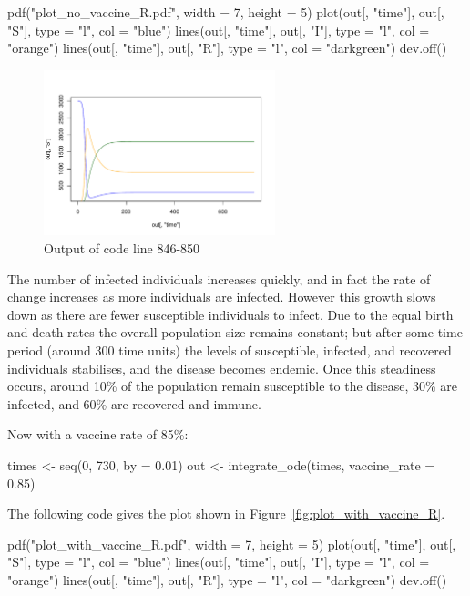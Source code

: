 \begin{Rin-no-test}
pdf("plot_no_vaccine_R.pdf", width = 7, height = 5)
plot(out[, "time"], out[, "S"], type = "l", col = "blue")
lines(out[, "time"], out[, "I"], type = "l", col = "orange")
lines(out[, "time"], out[, "R"], type = "l", col = "darkgreen")
dev.off()
\end{Rin-no-test}


\begin{figure}
\begin{center}
\includegraphics[width=0.6\textwidth]{./assets/plot_no_vaccine_R.pdf}
\end{center}
\caption{Output of code line 846-850}
\label{fig:plot_no_vaccine_R}
\end{figure}

The number of infected individuals increases quickly, and in fact the rate of
change increases as more individuals are infected. However this growth slows
down as there are fewer susceptible individuals to infect. Due to the equal
birth and death rates the overall population size remains constant; but after
some time period (around 300 time units) the levels of susceptible, infected,
and recovered individuals stabilises, and the disease becomes endemic. Once this
steadiness occurs, around 10\% of the population remain susceptible to the
disease, 30\% are infected, and 60\% are recovered and immune.

Now with a vaccine rate of 85\%:

\begin{Rin}
times <- seq(0, 730, by = 0.01)
out <- integrate_ode(times, vaccine_rate = 0.85)
\end{Rin}

The following code
gives the plot shown in Figure~\ref{fig:plot_with_vaccine_R}.

\begin{Rin-no-test}
pdf("plot_with_vaccine_R.pdf", width = 7, height = 5)
plot(out[, "time"], out[, "S"], type = "l", col = "blue")
lines(out[, "time"], out[, "I"], type = "l", col = "orange")
lines(out[, "time"], out[, "R"], type = "l", col = "darkgreen")
dev.off()
\end{Rin-no-test}


